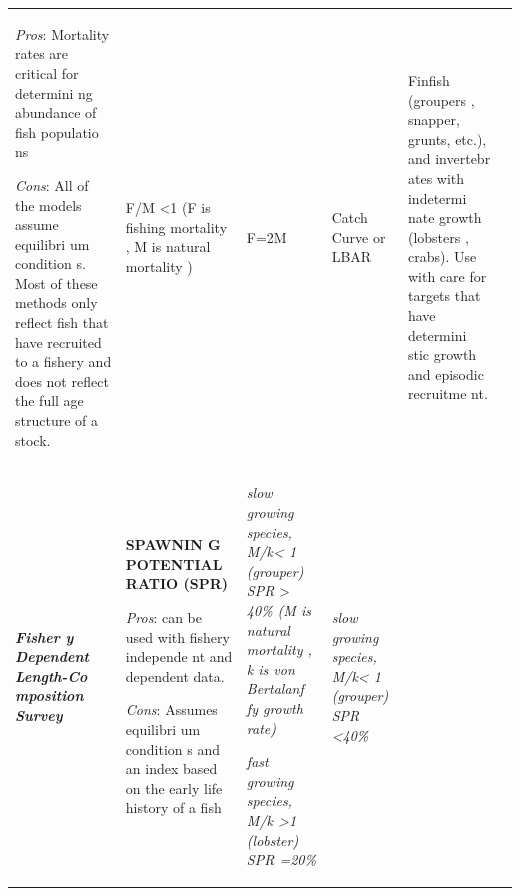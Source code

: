 \documentclass[]{book}
\begin{document}
\begin{longtable}[]{@{}llllll@{}}
\begin{minipage}[t]{0.16\columnwidth}
\emph{Pros}: Mortality rates are critical for determini ng abundance of
fish populatio ns

\emph{Cons}: All of the models assume equilibri um condition s. Most of
these methods only reflect fish that have recruited to a fishery and
does not reflect the full age structure of a stock.\strut
\end{minipage} & \begin{minipage}[t]{0.16\columnwidth}\raggedright\strut
F/M \textless{}1 (F is fishing mortality , M is natural mortality
)\strut
\end{minipage} & \begin{minipage}[t]{0.16\columnwidth}\raggedright\strut
F=2M\strut
\end{minipage} & \begin{minipage}[t]{0.16\columnwidth}\raggedright\strut
Catch Curve or LBAR\strut
\end{minipage} & \begin{minipage}[t]{0.16\columnwidth}\raggedright\strut
Finfish (groupers , snapper, grunts, etc.), and invertebr ates with
indetermi nate growth (lobsters , crabs). Use with care for targets that
have determini stic growth and episodic recruitme nt.\strut
\end{minipage}\tabularnewline
\begin{minipage}[t]{0.16\columnwidth}\raggedright\strut
\textbf{\emph{Fisher y Dependent Length-Co mposition Survey}}\strut
\end{minipage} & \begin{minipage}[t]{0.16\columnwidth}\raggedright\strut
\textbf{SPAWNIN G POTENTIAL RATIO (SPR)}

\emph{Pros}: can be used with fishery independe nt and dependent data.

\emph{Cons}: Assumes equilibri um condition s and an index based on the
early life history of a fish\strut
\end{minipage} & \begin{minipage}[t]{0.16\columnwidth}\raggedright\strut
\emph{slow growing species, M/k\textless{} 1 (grouper) SPR
}\textgreater{}\emph{ 40\% (M is natural mortality , k is von Bertalanf
fy growth rate)}

\emph{fast growing species, M/k \textgreater{}1 (lobster) SPR
=20\%}\strut
\end{minipage} & \begin{minipage}[t]{0.16\columnwidth}\raggedright\strut
\emph{slow growing species, M/k\textless{} 1 (grouper) SPR
\textless{}40\%}


\end{minipage}
\end{longtable}
\end{document}

